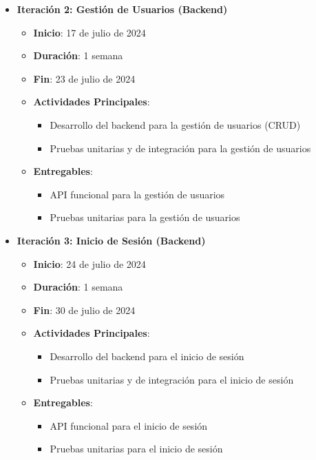 \begin{itemize}
\begin{itemize}
              \item \textbf{Iteración 2: Gestión de Usuarios (Backend)}
                    \begin{itemize}
                        \item \textbf{Inicio}: 17 de julio de 2024
                        \item \textbf{Duración}: 1 semana
                        \item \textbf{Fin}: 23 de julio de 2024
                        \item \textbf{Actividades Principales}:
                              \begin{itemize}
                                  \item Desarrollo del backend para la gestión de usuarios (CRUD)
                                  \item Pruebas unitarias y de integración para la gestión de usuarios
                              \end{itemize}
                        \item \textbf{Entregables}:
                              \begin{itemize}
                                  \item API funcional para la gestión de usuarios
                                  \item Pruebas unitarias para la gestión de usuarios
                              \end{itemize}
                    \end{itemize}

              \item \textbf{Iteración 3: Inicio de Sesión (Backend)}
                    \begin{itemize}
                        \item \textbf{Inicio}: 24 de julio de 2024
                        \item \textbf{Duración}: 1 semana
                        \item \textbf{Fin}: 30 de julio de 2024
                        \item \textbf{Actividades Principales}:
                              \begin{itemize}
                                  \item Desarrollo del backend para el inicio de sesión
                                  \item Pruebas unitarias y de integración para el inicio de sesión
                              \end{itemize}
                        \item \textbf{Entregables}:
                              \begin{itemize}
                                  \item API funcional para el inicio de sesión
                                  \item Pruebas unitarias para el inicio de sesión
                              \end{itemize}
                    \end{itemize}


\end{itemize}
\end{itemize}
